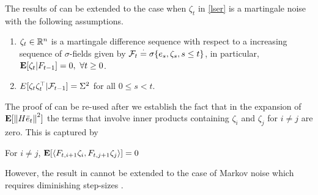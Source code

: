 The results of  can be extended to the case when $\zeta_t$ in \eqref{lser} is a martingale noise with the following assumptions.
\begin{assumption}
\begin{enumerate}
\item $\zeta_t\in \mathbb{R}^{n}$ is a martingale difference sequence with respect to a increasing sequence of $\sigma$-fields given by $\mathcal{F}_t\stackrel{\cdot}{=} \sigma \{e_s, \zeta_s,s\leq t\}$, in particular, $\mathbf{E}[\zeta_t|F_{t-1}]=0,~\forall t\geq 0$.
\item \label{secondmom} $E[\zeta_t \zeta_t^\top| \mathcal{F}_{t-1}]=\Sigma^2$ for all $0\leq s< t$.
\end{enumerate}
\end{assumption}
The proof of  can be re-used after we establish the fact that in the expansion of $\mathbf{E}[\left\| H\bar{e}_t\right\|^2]$ the terms that involve inner products containing $\zeta_i$ and $\zeta_j$ for $i\neq j$ are zero. This is captured by 
\begin{lemma}\label{crosstermmart}
For $i\neq j$, $\mathbf{E}[\langle F_{t,i+1}\zeta_{i},F_{t,j+1} \zeta_{j}\rangle]=0$
\end{lemma}
However, the result in  cannot be extended to the case of Markov noise which requires diminishing step-sizes \cite{prashanth,neurodyna}.
